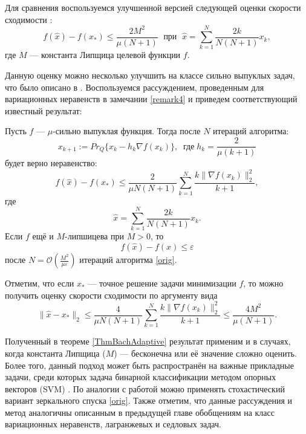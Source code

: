     Для сравнения воспользуемся улучшенной версией следующей оценки скорости сходимости \cite{Bach_2012}:
    \begin{equation}\label{orig_estimation_f}
        f(\widehat{x}) - f(x_*) \leq \frac{2 M^2}{\mu (N+1)}  \; \text{  при   } \; \widehat{x} = \sum\limits_{k=1}^{N} \frac{2 k}{N (N+1)} x_k, 
    \end{equation}
    где $M$ --- константа Липщица целевой функции $f$.

    Данную оценку можно несколько улучшить на классе сильно выпуклых задач, что было описано в \cite{Stonyakin_2021}. Воспользуемся рассуждением, проведенным для вариационных неравенств в замечании \ref{remark4} и приведем соответствующий известный результат:
    \begin{theorem}\label{ThmBachAdaptive}
        Пусть $f$ --- $\mu$-сильно выпуклая функция. Тогда после $N$ итераций алгоритма:
        $$
            x_{k+1} := Pr_{Q}\{x_k - h_k \nabla f(x_k) \}, \;\; \textit{где} \; h_k = \frac{2}{\mu (k+1)}
        $$
        будет верно неравенство:
        \begin{equation}\label{adaptive_estimation_f}
            f(\widehat{x}) - f(x_*) \leq \frac{2}{\mu N (N+1)} \sum_{k=1}^{N} \frac{k \|\nabla f(x_k)\|_2^2}{k+1},
        \end{equation}
        где
        $$
            \widehat{x} = \sum_{k=1}^{N} \frac{2 k}{N (N+1)} x_k.
        $$
        Если $f$ ещё и $M$-липшицева при $M >0$, то
        $$
             f(\widehat{x}) - f(x) \leq \varepsilon
        $$
        после $N = \mathcal{O}(\frac{M^2}{\mu\varepsilon})$ итераций алгоритма \eqref{orig}.
    \end{theorem}

    Отметим, что если $x_*$ --- точное решение задачи минимизации $f$, то можно получить оценку скорости сходимости по аргументу вида
    \begin{equation} \label{arg_est}
        \|\widehat{x} - x_*\|_2 \leq \frac{4}{\mu N (N+1)} \sum_{k=1}^{N} \frac{k \|\nabla f(x_k)\|_2^2}{k+1} \leq \frac{4M^2}{\mu(N+1)}.
    \end{equation}

    Полученный в теореме \ref{ThmBachAdaptive} результат применим и в случаях, когда константа Липщица ($M$) --- бесконечна или её значение сложно оценить. Более того, данный подход может быть распространён на важные прикладные задачи, среди которых задача бинарной классификации методом опорных векторов (SVM) \cite{Bach_2012}. По аналогии с работой \cite{Bach_2012} можно применять стохастический вариант зеркального спуска \eqref{orig}. Также отметим, что данные рассуждения и метод аналогичны описанным в предыдущей главе обобщениям на класс вариационных неравенств, лагранжевых и седловых задач. 

